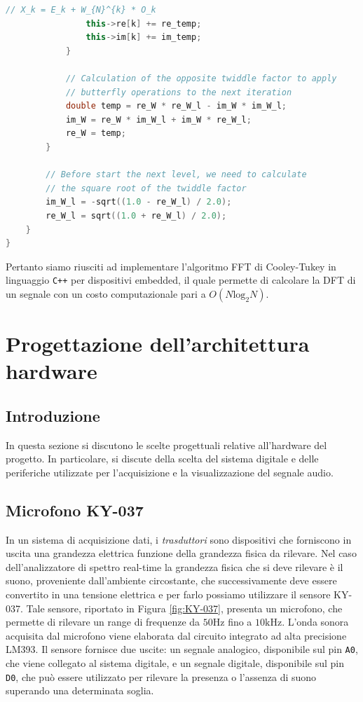 \documentclass[a4paper,12pt]{report}  %
\newcommand{\lstinlinebg}[1]{\colorbox{backcolour}{\lstinline|#1|}}
\begin{document}
\begin{lstlisting}[language=C++, keywords={void, sqrt, uint16_t, while, for, if, double, this, uint8_t}]
                // X_k = E_k + W_{N}^{k} * O_k
                this->re[k] += re_temp;
                this->im[k] += im_temp;
            }
    
            // Calculation of the opposite twiddle factor to apply
            // butterfly operations to the next iteration
            double temp = re_W * re_W_l - im_W * im_W_l;
            im_W = re_W * im_W_l + im_W * re_W_l;
            re_W = temp;
        }
    
        // Before start the next level, we need to calculate
        // the square root of the twiddle factor
        im_W_l = -sqrt((1.0 - re_W_l) / 2.0);
        re_W_l = sqrt((1.0 + re_W_l) / 2.0);
    }
}
\end{lstlisting}

Pertanto siamo riusciti ad implementare l'algoritmo FFT di Cooley-Tukey in linguaggio \lstinlinebg{C++} per dispositivi embedded, il quale permette di calcolare la DFT di un segnale con un costo computazionale pari a $O(N \text{log}_2 N)$.

\section{Progettazione dell'architettura hardware}\label{sec:design}

\subsection{Introduzione}
In questa sezione si discutono le scelte progettuali relative all'hardware del progetto.
In particolare, si discute della scelta del sistema digitale e delle periferiche utilizzate per l'acquisizione e la visualizzazione del segnale audio.

\subsection{Microfono KY-037}
In un sistema di acquisizione dati, i \textit{trasduttori} sono dispositivi che forniscono in uscita una grandezza elettrica funzione della grandezza fisica da rilevare.
Nel caso dell'analizzatore di spettro real-time la grandezza ﬁsica che si deve rilevare è il suono, proveniente dall'ambiente circostante, che successivamente deve essere convertito in una tensione elettrica e per farlo possiamo utilizzare il sensore KY-037.
Tale sensore, riportato in Figura \ref{fig:KY-037}, presenta un microfono, che permette di rilevare un range di frequenze da $50 \text{Hz}$ ﬁno a $10 \text{kHz}$.
L'onda sonora acquisita dal microfono viene elaborata dal circuito integrato ad alta precisione LM393.
Il sensore fornisce due uscite: un segnale analogico, disponibile sul pin \lstinlinebg{A0}, che viene collegato al sistema digitale, e un segnale digitale, disponibile sul pin \lstinlinebg{D0}, che può essere utilizzato per rilevare la presenza o l'assenza di suono superando una determinata soglia.
\end{document}
